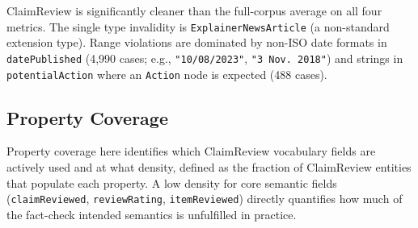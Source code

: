 \documentclass[11pt,a4paper]{article}
\begin{document}
ClaimReview is significantly cleaner than the full-corpus average on all
four metrics.  The single type invalidity is \texttt{ExplainerNewsArticle}
(a non-standard extension type).  Range violations are
dominated by non-ISO date formats in \texttt{datePublished}
(4{,}990 cases; e.g., \texttt{"10/08/2023"}, \texttt{"3 Nov. 2018"}) and
strings in \texttt{potentialAction} where an \texttt{Action} node is expected
(488 cases).

\subsection{Property Coverage}

Property coverage here identifies which ClaimReview vocabulary fields are
actively used and at what density, defined as the fraction of ClaimReview entities
that populate each property.
A low density for core semantic fields (\texttt{claimReviewed},
\texttt{reviewRating}, \texttt{itemReviewed}) directly quantifies how much
of the fact-check intended semantics is unfulfilled in practice.
\end{document}
